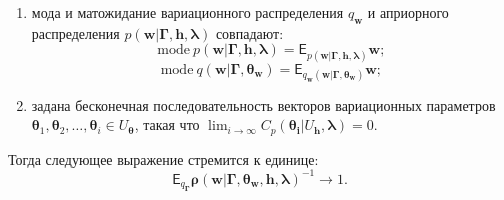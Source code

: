 \begin{theorem}
\begin{enumerate}
\item мода и матожидание вариационного распределения $q_\mathbf{w}$ и априорного распределения $p(\mathbf{w}|\boldsymbol{\Gamma},\mathbf{h}, \boldsymbol{\lambda})$  совпадают:
\[
    \text{mode}~p(\mathbf{w}|\boldsymbol{\Gamma},\mathbf{h}, \boldsymbol{\lambda}) = \mathsf{E}_{p(\mathbf{w}| \boldsymbol{\Gamma}, \mathbf{h}, \boldsymbol{\lambda})} \mathbf{w};
\]
\[
  \text{mode}~q(\mathbf{w}|\boldsymbol{\Gamma}, \boldsymbol{\theta}_\mathbf{w}) = \mathsf{E}_{q_\mathbf{w}(\mathbf{w}|\boldsymbol{\Gamma},  \boldsymbol{\theta}_\mathbf{w})} \mathbf{w};
\]

\item задана  бесконечная последовательность векторов вариационных параметров $\boldsymbol{\theta}_1,\boldsymbol{\theta}_2,\dots, \boldsymbol{\theta}_i \in U_{\boldsymbol{\theta}}$, такая что $\lim_{i \to \infty}C_p(\boldsymbol{\theta_i}|U_{\mathbf{h}}, \boldsymbol{\lambda}) = 0.$ 

\end{enumerate}
Тогда следующее выражение стремится к единице:
\[
   \mathsf{E}_{q_{\boldsymbol{\Gamma}}} \boldsymbol{\rho}(\mathbf{w}|\boldsymbol{\Gamma}, \boldsymbol{\theta}_\mathbf{w}, \mathbf{h},\boldsymbol{\lambda})^{-1} \to 1.
\]


\end{theorem}

